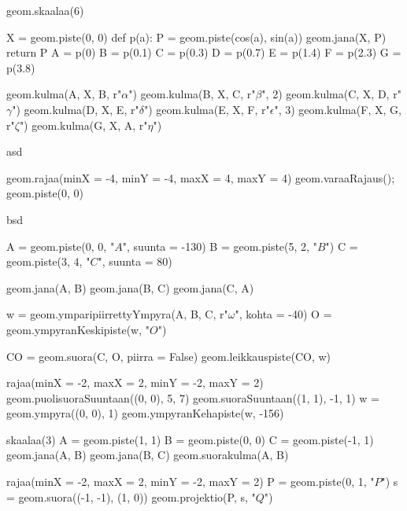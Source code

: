 \begin{kuva}
geom.skaalaa(6)

X = geom.piste(0, 0)
def p(a):
	P = geom.piste(cos(a), sin(a))
	geom.jana(X, P)
	return P
A = p(0)
B = p(0.1)
C = p(0.3)
D = p(0.7)
E = p(1.4)
F = p(2.3)
G = p(3.8)

geom.kulma(A, X, B, r"$\alpha$")
geom.kulma(B, X, C, r"$\beta$", 2)
geom.kulma(C, X, D, r"$\gamma$")
geom.kulma(D, X, E, r"$\delta$")
geom.kulma(E, X, F, r"$\epsilon$", 3)
geom.kulma(F, X, G, r"$\zeta$")
geom.kulma(G, X, A, r"$\eta$")
\end{kuva}

asd

\begin{kuva}
geom.rajaa(minX = -4, minY = -4, maxX = 4, maxY = 4)
geom.varaaRajaus();
geom.piste(0, 0)
\end{kuva}

bsd


\begin{kuva}
A = geom.piste(0, 0, "$A$", suunta = -130)
B = geom.piste(5, 2, "$B$")
C = geom.piste(3, 4, "$C$", suunta = 80)

geom.jana(A, B)
geom.jana(B, C)
geom.jana(C, A)

w = geom.ymparipiirrettyYmpyra(A, B, C, r"$\omega$", kohta = -40)
O = geom.ympyranKeskipiste(w, "$O$")

CO = geom.suora(C, O, piirra = False)
geom.leikkauspiste(CO, w)
\end{kuva}

\begin{kuva}
rajaa(minX = -2, maxX = 2, minY = -2, maxY = 2)
geom.puolisuoraSuuntaan((0, 0), 5, 7)
geom.suoraSuuntaan((1, 1), -1, 1)
w = geom.ympyra((0, 0), 1)
geom.ympyranKehapiste(w, -156)
\end{kuva}

\begin{kuva}
skaalaa(3)
A = geom.piste(1, 1)
B = geom.piste(0, 0)
C = geom.piste(-1, 1)
geom.jana(A, B)
geom.jana(B, C)
geom.suorakulma(A, B)
\end{kuva}

\begin{kuva}
rajaa(minX = -2, maxX = 2, minY = -2, maxY = 2)
P = geom.piste(0, 1, "$P$")
s = geom.suora((-1, -1), (1, 0))
geom.projektio(P, s, "$Q$")
\end{kuva}
